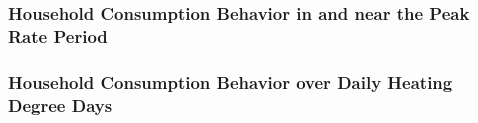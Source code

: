 \subsubsection{Household Consumption Behavior in and near the Peak Rate Period}
\label{Sub-subsection:Household-Consumption-Behavior-in-and-near-the-Peak-Rate-Period}



\subsubsection{Household Consumption Behavior over Daily Heating Degree Days}
\label{Sub-subsection:Household-Consumption-Behavior-over-Daily-HDDs}

